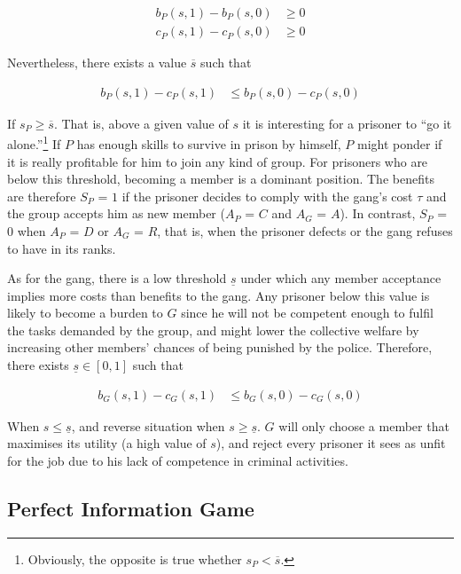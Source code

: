 \begin{align}
b_P\left(s,1\right) - b_P\left(s,0\right) &\geq 0\\
c_P\left(s,1\right) - c_P\left(s,0\right) &\geq 0
\end{align}

Nevertheless, there exists a value $\overline{s}$ such that

\begin{align}
b_P\left(s,1\right) - c_P\left(s,1\right) &\leq b_P\left(s,0\right) - c_P\left(s,0\right)
\end{align}

If $s_P \geq \overline{s}$. That is, above a given value of $s$ it is interesting for a prisoner to ``go it alone.''\footnote{Obviously, the opposite is true whether $s_P < \overline{s}$.} If $P$ has enough skills to survive in prison by himself, $P$ might ponder if it is really profitable for him to join any kind of group. For prisoners who are below this threshold, becoming a member is a dominant position. The benefits are therefore $S_P$ = $1$ if the prisoner decides to comply with the gang's cost $\tau$ and the group accepts him as new member ($A_P$ = $C$ and $A_G$ = $A$). In contrast, $S_P$ = $0$ when $A_P$ = $D$ or $A_G$ = $R$, that is, when the prisoner defects or the gang refuses to have in its ranks. 

As for the gang, there is a low threshold $\underline{s}$ under which any member acceptance implies more costs than benefits to the gang. Any prisoner below this value is likely to become a burden to $G$ since he will not be competent enough to fulfil the tasks demanded by the group, and might lower the collective welfare by increasing other members' chances of being punished by the police. Therefore, there exists $\underline{s} \in \left[0, 1\right]$ such that

\begin{align}
b_G\left(s,1\right) - c_G\left(s,1\right) &\leq b_G\left(s,0\right) - c_G\left(s,0\right)
\end{align}

When $s\leq \underline{s}$, and reverse situation when $s \geq \underline{s}$. $G$ will only choose a member that maximises its utility (a high value of $s$), and reject every prisoner it sees as unfit for the job due to his lack of competence in criminal activities.

\subsection{Perfect Information Game}

